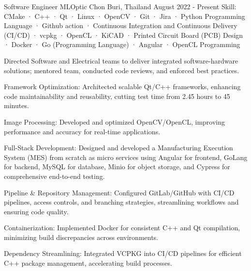 
\begin{cventries}

  \cventry
    {Software Engineer} %
    {MLOptic} %
    {Chon Buri, Thailand} %
    {August 2022 - Present} %
    {Skill: CMake · C++ · Qt · Linux · OpenCV · Git · Jira · Python Programming Language · Github action · Continuous Integration and Continuous Delivery (CI/CD) · vcpkg · OpenCL · KiCAD · Printed Circuit Board (PCB) Design · Docker · Go (Programming Language) · Angular · OpenCL Programming} %
    {
      \begin{cvitems} %
      \item {Directed Software and Electrical teams to deliver integrated software-hardware solutions; mentored team, conducted code reviews, and enforced best practices.}
      \item {Framework Optimization: Architected scalable Qt/C++ frameworks, enhancing code maintainability and reusability, cutting test time from 2.45 hours to 45 minutes.}
      \item {Image Processing: Developed and optimized OpenCV/OpenCL, improving performance and accuracy for real-time applications.}
      \item {Full-Stack Development: Designed and developed a Manufacturing Execution System (MES) from scratch as micro services using Angular for frontend, GoLang for backend, MySQL for database, Minio for object storage, and Cypress for comprehensive end-to-end testing.}
      \item {Pipeline \& Repository Management: Configured GitLab/GitHub with CI/CD pipelines, access controls, and branching strategies, streamlining workflows and ensuring code quality.}
      \item {Containerization: Implemented Docker for consistent C++ and Qt compilation, minimizing build discrepancies across environments.}
      \item {Dependency Streamlining: Integrated VCPKG into CI/CD pipelines for efficient C++ package management, accelerating build processes.}

\end{cvitems}}
\end{cventries}
